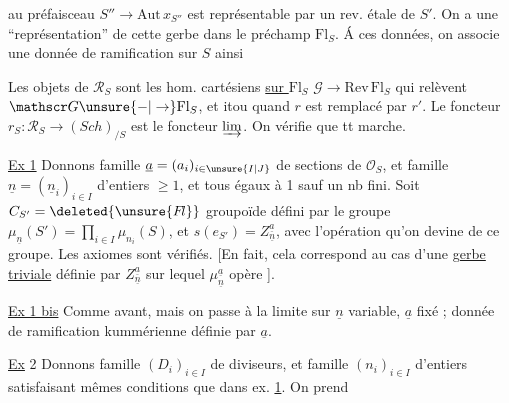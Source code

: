 au préfaisceau $S''\longrightarrow\mathrm{Aut}\,x_{S''}$ est représentable par un  rev. étale de $S'$. On a une ``représentation'' de cette gerbe dans le préchamp $\mathrm{Fl}_S$. Á ces  données, on associe une donnée de ramification sur $S$ ainsi

Les objets de $\mathscr R_S$ sont les hom. cartésiens \uline{sur $\mathrm{Fl}_S$} $\mathscr G\longrightarrow\mathrm{Rev}\,\mathrm{Fl}_S$ qui relèvent $\mathscr G\unsure{-|\to}\mathrm{Fl}_S$, et itou quand $r$ est remplacé par $r'$.
Le foncteur $r_S:\mathscr R_S\longrightarrow (Sch)_{/S}$ est le foncteur $\varinjlim$. On vérifie que tt marche.

\uline{Ex 1} Donnons  famille $\underline a=(a_i)_{i\in\unsure{I|J}}$ de sections de $\mathcal O_S$, et famille $\underline n=(\underline n_i)_{i\in I}$ d'entiers $\geq1$,   et tous égaux à 1 sauf un nb fini.  Soit $C_{S'}=\deleted{\unsure{F\!l}}$ groupoïde défini par le groupe $\mu_{\underline n}(S')=\prod_{i\in I}\mu_{n_i}(S)$,  et $s(e_{S'})=Z_{\underline n}^{\underline a}$, avec l'opération qu'on devine de ce groupe. Les axiomes sont vérifiés. [En fait, cela correspond au cas d'une \uline{gerbe triviale} définie par $Z_{\underline n}^{\underline a}$ sur lequel $\mu_{\underline n}^{\underline a}$ opère ].

\uline{Ex 1 bis}  Comme avant, mais on passe à la limite sur $\underline n$ variable, $\underline a$ fixé ; donnée de ramification kummérienne définie par $\underline a$.

\uline{Ex} 2 Donnons famille $(D_i)_{i\in I}$ de diviseurs, et famille $(n_i)_{i\in I}$ d'entiers satisfaisant mêmes conditions que dans ex. \uline{1}. On prend
